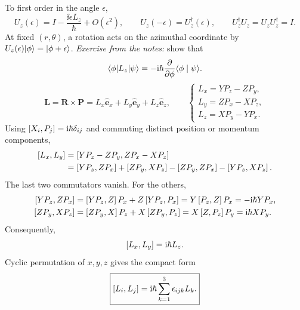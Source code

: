 To first order in the angle $\epsilon$,
\[
 U_z(\epsilon)=I-\frac{\ii\epsilon L_z}{\hbar}+O(\epsilon^2),
 \qquad U_z(-\epsilon)=U_z^\dagger(\epsilon),
 \qquad U_z^\dagger U_z=U_zU_z^\dagger=I.
\]
At fixed $(r,\theta)$, a rotation acts on the azimuthal coordinate by
$U_z(\epsilon)\lvert \phi\rangle=\lvert \phi+\epsilon\rangle$.
\textit{Exercise from the notes:} show that
\[
 \langle \phi\rvert L_z\lvert \psi\rangle=-\mathrm{i}\hbar\frac{\partial}{\partial\phi}
 \langle \phi\mid \psi\rangle.
\]
\[
 \mathbf L=\mathbf R\times\mathbf P
 =L_x\hat{\mathbf e}_x+L_y\hat{\mathbf e}_y+L_z\hat{\mathbf e}_z,
 \qquad
 \begin{cases}
 L_x=YP_z-ZP_y,\\
 L_y=ZP_x-XP_z,\\
 L_z=XP_y-YP_x.
 \end{cases}
\]
Using $\left[X_i,P_j\right]=\mathrm{i}\hbar\delta_{ij}$ and commuting distinct
position or momentum components,
\begin{align*}
 \left[L_x,L_y\right]
 &=\left[YP_z-ZP_y,ZP_x-XP_z\right]\\
 &=\left[YP_z,ZP_x\right]+\left[ZP_y,XP_z\right]
   -\left[ZP_y,ZP_x\right]-\left[YP_z,XP_z\right].
\end{align*}
The last two commutators vanish. For the others,
\begin{align*}
 \left[YP_z,ZP_x\right]
 &=\left[YP_z,Z\right]P_x+Z\left[YP_z,P_x\right]
 =Y\left[P_z,Z\right]P_x=-\mathrm{i}\hbar YP_x,\\
 \left[ZP_y,XP_z\right]
 &=\left[ZP_y,X\right]P_z+X\left[ZP_y,P_z\right]
 =X\left[Z,P_z\right]P_y=\mathrm{i}\hbar XP_y.
\end{align*}
Consequently,
\[
 \left[L_x,L_y\right]=\mathrm{i}\hbar L_z.
\]
Cyclic permutation of $x,y,z$ gives the compact form
\[
 \boxed{\left[L_i,L_j\right]=\mathrm{i}\hbar\sum_{k=1}^{3}\epsilon_{ijk}L_k.}
\]
